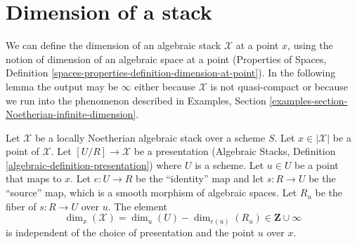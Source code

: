 \section{Dimension of a stack}
\label{section-dimension}

\noindent
We can define the dimension of an algebraic stack $\mathcal{X}$
at a point $x$, using the notion of dimension of an algebraic space
at a point (Properties of Spaces, Definition
\ref{spaces-properties-definition-dimension-at-point}).
In the following lemma the output may be $\infty$ either because
$\mathcal{X}$ is not quasi-compact or because we run into the
phenomenon described in Examples, Section
\ref{examples-section-Noetherian-infinite-dimension}.

\begin{lemma}
\label{lemma-dimension-at-point-well-defined}
Let $\mathcal{X}$ be a locally Noetherian algebraic stack over a scheme $S$.
Let $x \in |\mathcal{X}|$ be a point of $\mathcal{X}$.
Let $[U/R] \to \mathcal{X}$ be a presentation
(Algebraic Stacks, Definition \ref{algebraic-definition-presentation})
where $U$ is a scheme. Let $u \in U$ be a point that maps to $x$.
Let $e : U \to R$ be the ``identity'' map and let $s : R \to U$ be the
``source'' map, which is a smooth morphism of algebraic spaces. Let $R_u$
be the fiber of $s : R \to U$ over $u$. The element
$$
\dim_x(\mathcal{X}) = \dim_u(U) - \dim_{e(u)}(R_u) \in \mathbf{Z} \cup \infty
$$
is independent of the choice of presentation and the point $u$ over $x$.
\end{lemma}

